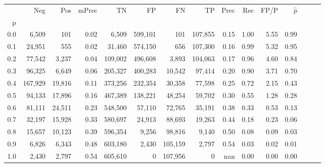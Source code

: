\begin{tabular}{rrrrrrrrrrrrrrr}
\toprule
{} &      Neg &     Pos & mPrec &       TN &       FP &       FN &       TP &  Prec &   Rec &  FP/P & $\hat{p}$ \\
p   &          &         &       &          &          &          &          &       &       &       &           \\
\midrule
0.0 &    6,509 &     101 &  0.02 &    6,509 &  599,101 &      101 &  107,855 &  0.15 &  1.00 &  5.55 &      0.99 \\
0.1 &   24,951 &     555 &  0.02 &   31,460 &  574,150 &      656 &  107,300 &  0.16 &  0.99 &  5.32 &      0.95 \\
0.2 &   77,542 &   3,237 &  0.04 &  109,002 &  496,608 &    3,893 &  104,063 &  0.17 &  0.96 &  4.60 &      0.84 \\
0.3 &   96,325 &   6,649 &  0.06 &  205,327 &  400,283 &   10,542 &   97,414 &  0.20 &  0.90 &  3.71 &      0.70 \\
0.4 &  167,929 &  19,816 &  0.11 &  373,256 &  232,354 &   30,358 &   77,598 &  0.25 &  0.72 &  2.15 &      0.43 \\
0.5 &   94,133 &  17,896 &  0.16 &  467,389 &  138,221 &   48,254 &   59,702 &  0.30 &  0.55 &  1.28 &      0.28 \\
0.6 &   81,111 &  24,511 &  0.23 &  548,500 &   57,110 &   72,765 &   35,191 &  0.38 &  0.33 &  0.53 &      0.13 \\
0.7 &   32,197 &  15,928 &  0.33 &  580,697 &   24,913 &   88,693 &   19,263 &  0.44 &  0.18 &  0.23 &      0.06 \\
0.8 &   15,657 &  10,123 &  0.39 &  596,354 &    9,256 &   98,816 &    9,140 &  0.50 &  0.08 &  0.09 &      0.03 \\
0.9 &    6,826 &   6,343 &  0.48 &  603,180 &    2,430 &  105,159 &    2,797 &  0.54 &  0.03 &  0.02 &      0.01 \\
1.0 &    2,430 &   2,797 &  0.54 &  605,610 &        0 &  107,956 &        0 &   nan &  0.00 &  0.00 &      0.00 \\
\bottomrule
\end{tabular}
